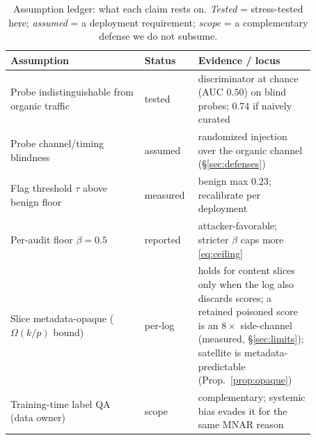 \documentclass[conference]{IEEEtran}
\begin{document}
\begin{table}[t]\centering\footnotesize\setlength{\tabcolsep}{4pt}
\renewcommand{\arraystretch}{1.15}
\caption{Assumption ledger: what each claim rests on. \emph{Tested} = stress-tested here; \emph{assumed} =
a deployment requirement; \emph{scope} = a complementary defense we do not subsume.}
\label{tab:assumptions}
\begin{tabular}{@{}>{\raggedright\arraybackslash}p{0.40\linewidth}>{\raggedright\arraybackslash}p{0.12\linewidth}>{\raggedright\arraybackslash}p{0.35\linewidth}@{}}
\toprule
Assumption & Status & Evidence / locus \\
\midrule
Probe indistinguishable from organic traffic & tested & discriminator at chance (AUC $0.50$) on blind probes; $0.74$ if naively curated \\
Probe channel/timing blindness & assumed & randomized injection over the organic channel (\S\ref{sec:defenses}) \\
Flag threshold $\tau$ above benign floor & measured & benign max $0.23$; recalibrate per deployment \\
Per-audit floor $\beta{=}0.5$ & reported & attacker-favorable; stricter $\beta$ caps more \eqref{eq:ceiling} \\
Slice metadata-opaque ($\Omega(k/p)$ bound) & per-log & holds for content slices only when the log also discards scores; a retained poisoned score is an $8\times$ side-channel (measured, \S\ref{sec:limits}); satellite is metadata-predictable (Prop.~\ref{prop:opaque}) \\
Training-time label QA (data owner) & scope & complementary; systemic bias evades it for the same MNAR reason \\
\bottomrule
\end{tabular}
\end{table}
\end{document}
